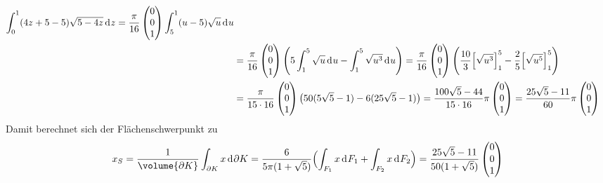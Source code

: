 \documentclass[../full]{subfiles}
\begin{document}
\begin{align*}
        \int_0^1 \paren{4z + 5 - 5} \sqrt{5 - 4z} \dx[z]
        = \frac{\pi}{16} \begin{pmatrix} 0 \\ 0 \\ 1 \end{pmatrix}
        \int_5^1 \paren{u - 5} \sqrt{u} \dx[u]
        \\ &
        = \frac{\pi}{16} \begin{pmatrix} 0 \\ 0 \\ 1 \end{pmatrix}
        \paren[\Bigg]{
            5 \int_1^5 \sqrt{u} \dx[u] - \int_1^5 \sqrt{u^3} \dx[u]
        }
        = \frac{\pi}{16} \begin{pmatrix} 0 \\ 0 \\ 1 \end{pmatrix}
        \paren[\Bigg]{
            \frac{10}{3} \FunctionBounds{\sqrt{u^3}}{1}{5}
            - \frac{2}{5} \FunctionBounds{\sqrt{u^5}}{1}{5}
        }
        \\ &
        = \frac{\pi}{15 \cdot 16} \begin{pmatrix} 0 \\ 0 \\ 1 \end{pmatrix}
        \paren[\big]{50 \paren{5 \sqrt{5} - 1} - 6 \paren{25 \sqrt{5} - 1}}
        = \frac{100 \sqrt{5} - 44}{15 \cdot 16} \pi
        \begin{pmatrix} 0 \\ 0 \\ 1 \end{pmatrix}
        = \frac{25 \sqrt{5} - 11}{60} \pi
        \begin{pmatrix} 0 \\ 0 \\ 1 \end{pmatrix}
    \end{align*}
    Damit berechnet sich der Fl\"achenschwerpunkt zu
    \begin{equation*}
        x_S = \frac{1}{\volume{\partial K}} \int_{\partial K} x \dF[\partial K]
        = \frac{6}{5 \pi \paren{1 + \sqrt{5}}}
        \paren[\Big]{\int_{F_1} x \dF[F_1] + \int_{F_2} x \dF[F_2]}
        = \frac{25 \sqrt{5} - 11}{50 \paren{1 + \sqrt{5}}}
        \begin{pmatrix} 0 \\ 0 \\ 1 \end{pmatrix}
    \end{equation*}
\end{document}
